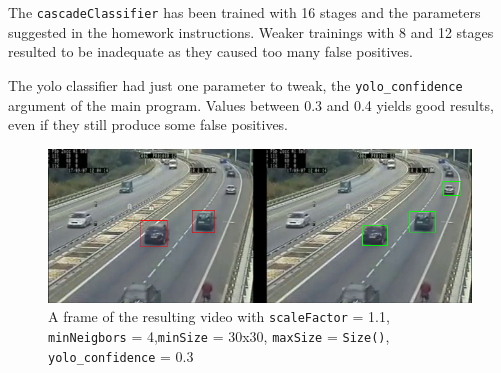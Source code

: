 \documentclass[12pt]{article}
\begin{document}
The \texttt{cascadeClassifier} has been trained with 16 stages and the parameters suggested in the homework instructions. Weaker trainings with 8 and 12 stages resulted to be inadequate as they caused too many false positives.

The yolo classifier had just one parameter to tweak, the \texttt{yolo\_confidence} argument of the main program. Values between 0.3 and 0.4 yields good results, even if they still produce some false positives.



\begin{figure}[ht!]
	\centering
 	\includegraphics[scale = 0.7]{./frame}
	\caption{ A frame of the resulting video with \texttt{scaleFactor} = 1.1, \texttt{minNeigbors} = 4,\texttt{minSize} = 30x30, \texttt{maxSize} = \texttt{Size()}, \texttt{yolo\_confidence} = 0.3}
\end{figure}
 
\end{document}
